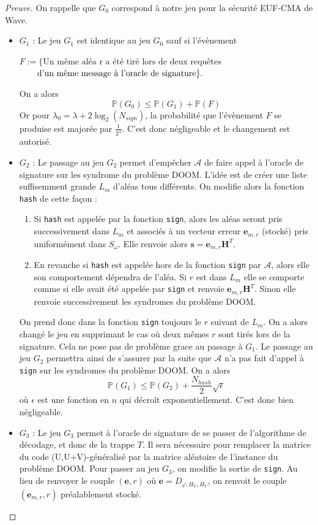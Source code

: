 \documentclass[12pt]{article}
\theoremstyle{plain}
\newcommand{\A}{\mathcal{A}}
\newcommand{\e}{\mathbf{e}}
\newcommand{\s}{\mathbf{s}}
\begin{document}
\begin{proof}[Preuve] On rappelle que $G_0$ correspond à notre jeu pour la sécurité EUF-CMA de Wave.
\begin{itemize} 
\item $G_1$ : Le jeu $G_1$ est identique au jeu $G_0$ sauf si l'évènement 
\begin{center}
$F := \{\text{Un même aléa r a été tiré lors de deux requêtes}$
$\text{\qquad d'un même message à l'oracle de signature}\}.$
\end{center}
On a alors 
$$ \mathbb{P}(G_0) \leq  \mathbb{P}(G_1) +  \mathbb{P}(F) $$
Or pour $\lambda_0=\lambda + 2\log_2(N_{sign})$, la probabilité que l'évènement $F$ se produise est majorée par $\frac{1}{2^{\lambda}}$. C'est donc négligeable et le changement est autorisé.
\item $G_2$ : Le passage au jeu $G_2$ permet d'empêcher $\A$ de faire appel à l'oracle de signature sur les syndrome du problème DOOM. L'idée est de créer une liste suffisemment grande $L_m$ d'aléas tous différents. On modifie alors la fonction \verb|hash| de cette façon :
	\begin{enumerate}
	\item Si \verb|hash| est appelée par la fonction \verb|sign|, alors les aléas seront pris successivement dans $L_m$ et associés à un vecteur erreur $\e_{m,r}$ (stocké) pris uniformément dans $S_{\omega}$. Elle renvoie alors $\s=\e_{m,r}\mathbf{H}^T$.
	\item En revanche si \verb|hash| est appelée hors de la fonction \verb|sign| par $\A$, alors elle son comportement dépendra de l'aléa. Si $r$ est dans $L_m$ elle se comporte comme si elle avait été appelée par \verb|sign| et renvoie $\e_{m,r}\mathbf{H}^T$. Sinon elle renvoie successivement les syndromes du problème DOOM.
	\end{enumerate}
On prend donc dans la fonction \verb|sign| toujours le $r$ suivant de $L_m$. On a alors changé le jeu en supprimant le cas où deux mêmes $r$ sont tirés lors de la signature. Cela ne pose pas de problème grace au passage à $G_1$. Le passage au jeu $G_2$ permettra ainsi de s'assurer par la suite que $\A$ n'a pas fait d'appel à \verb|sign| sur les syndromes du problème DOOM.
On a alors 
$$ \mathbb{P}(G_1) \leq  \mathbb{P}(G_2) +  \frac{N_{hash}}{2}\sqrt{\epsilon} $$
où $\epsilon$ est une fonction en $n$ qui décroît exponentiellement. C'est donc bien négligeable.
\item $G_3$ : Le jeu $G_3$ permet à l'oracle de signature de se passer de l'algorithme de décodage, et donc de la trappe $T$. Il sera nécessaire pour remplacer la matrice du code (U,U+V)-généralisé par la matrice aléatoire de l'instance du problème DOOM. Pour passer au jeu $G_3$, on modifie la sortie de \verb|sign|. Au lieu de renvoyer le couple $(\e,r)$ où $\e = D_{\varphi,H_U,H_V}$, on renvoit le couple $(\e_{m,r},r)$ préalablement stocké.\\

\end{itemize}
\end{proof}
\end{document}
